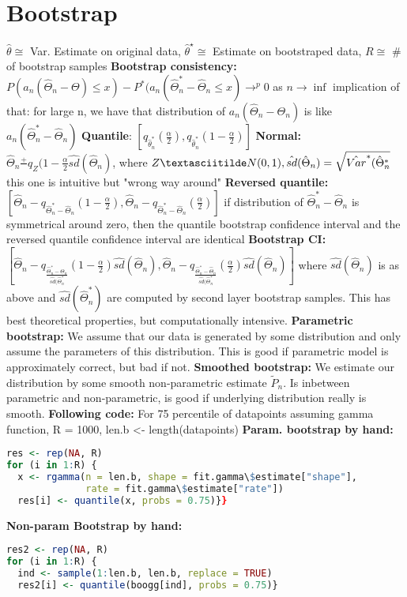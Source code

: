 \section{Bootstrap}
$\hat{\theta} \cong$ Var. Estimate on original data, $\hat{\theta}^\star \cong$ Estimate on bootstraped data, $R \cong$ \# of bootstrap samples
\textbf{Bootstrap consistency: }$P(a_n(\hat\Theta_n-\Theta) \leq x)-P^*(a_n(\hat\Theta_n^*-\hat\Theta_n \leq x) \rightarrow^p 0$ as $n \rightarrow \inf$ implication of that: for large n, we have that distribution of $a_n(\hat\Theta_n - \Theta_n)$ is like $a_n(\hat\Theta^*_n- \hat\Theta_n)$
\textbf{Quantile}: $[q_{\hat\theta_n^*}(\frac{\alpha}{2}),q_{\hat\theta_n^*}(1-\frac{\alpha}{2})]$
\textbf{Normal: }$\hat\Theta_n \frac{+}{} q_Z(1-\frac{\alpha}{2}\hat{sd}(\hat\Theta_n)$, where $Z \textasciitilde N(0,1), \hat{sd}(\hat \Theta_n) = \sqrt{\hat{Var}^*(\hat{\Theta}_n^*}$ this one is intuitive but "wrong way around"
\textbf{Reversed quantile: } $[\hat\Theta_n - q_{\hat\Theta_n^*-\hat\Theta_n}(1-\frac{\alpha}{2}), \hat\Theta_n - q_{\hat\Theta_n^*-\hat\Theta_n}(\frac{\alpha}{2})]$  if distribution of $\hat \Theta_n^*- \hat \Theta_n$ is symmetrical around zero, then the quantile bootstrap confidence interval and the reversed quantile confidence interval are identical 
\textbf{Bootstrap CI: }$[\hat\Theta_n - q_{\frac{\hat\Theta_n^*-\hat\Theta_n}{\hat{sd}(\hat\Theta_n^*}}(1-\frac{\alpha}{2})\hat{sd}(\hat\Theta_n), \hat\Theta_n - q_{\frac{\hat\Theta_n^*-\hat\Theta_n}{\hat{sd}(\hat\Theta_n^*}}(\frac{\alpha}{2})\hat{sd}(\hat\Theta_n)]$ where $\hat{sd}(\hat\Theta_n)$ is as above and $\hat{sd}(\hat\Theta_n^*)$ are computed by second layer bootstrap samples. This has best theoretical properties, but computationally intensive. 
\textbf{Parametric bootstrap: } We assume that our data is generated by some distribution and only assume the parameters of this distribution. This is good if parametric model is approximately correct, but bad if not. 
\textbf{Smoothed bootstrap: } We estimate our distribution by some smooth non-parametric estimate $\tilde P_n$. Is inbetween parametric and non-parametric, is good if underlying distribution really is smooth. 
\textbf{Following code:} For 75 percentile of datapoints assuming gamma function, R = 1000, len.b <- length(datapoints)
\textbf{Param. bootstrap by hand:}
\begin{lstlisting}[language=R]
res <- rep(NA, R)
for (i in 1:R) {
  x <- rgamma(n = len.b, shape = fit.gamma\$estimate["shape"],
              rate = fit.gamma\$estimate["rate"])
  res[i] <- quantile(x, probs = 0.75)}}
\end{lstlisting}
\textbf{Non-param Bootstrap by hand:}
\begin{lstlisting}[language=R]
res2 <- rep(NA, R)
for (i in 1:R) {
  ind <- sample(1:len.b, len.b, replace = TRUE)
  res2[i] <- quantile(boogg[ind], probs = 0.75)}
\end{lstlisting}

